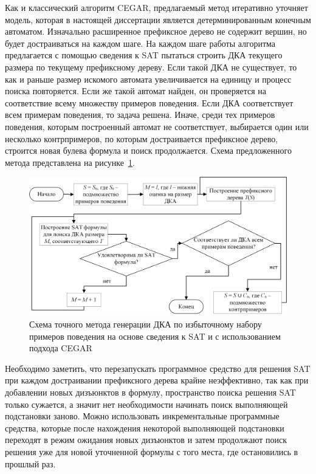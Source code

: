 Как и классический алгоритм CEGAR, предлагаемый метод итеративно уточняет модель, которая в настоящей диссертации является детерминированным конечным автоматом.
Изначально расширенное префиксное дерево не содержит вершин, но будет достраиваться на каждом шаге.
На каждом шаге работы алгоритма предлагается с помощью сведения к SAT пытаться строить ДКА текущего размера по текущему префиксному дереву.
Если такой ДКА не существует, то как и раньше размер искомого автомата увеличивается на единицу и процесс поиска повторяется.
Если же такой автомат найден, он проверяется на соответствие всему множеству примеров поведения.
Если ДКА соответствует всем примерам поведения, то задача решена.
Иначе, среди тех примеров поведения, которым построенный автомат не соответствует, выбирается один или несколько контрпримеров, по которым достраивается префиксное дерево, строится новая булева формула и поиск продолжается.
Схема предложенного метода представлена на рисунке~\ref{img:cegar-algo}.

\begin{figure}[ht]
  \centering
  \includegraphics[scale=0.5]{img/ntv/cegar.jpg}
  \caption{Схема точного метода генерации ДКА по избыточному набору примеров поведения на основе сведения к SAT и с использованием подхода CEGAR}
  \label{img:cegar-algo}
\end{figure}

Необходимо заметить, что перезапускать программное средство для решения SAT при каждом достраивании префиксного дерева крайне неэффективно, так как при добавлении новых дизъюнктов в формулу, пространство поиска решения SAT только сужается, а значит нет необходимости начинать поиск выполняющей подстановки заново.
Можно использовать инкрементальные программные средства, которые после нахождения некоторой выполняющей подстановки переходят в режим ожидания новых дизъюнктов и затем продолжают поиск решения уже для новой уточненной формулы с того места, где остановились в прошлый раз.


